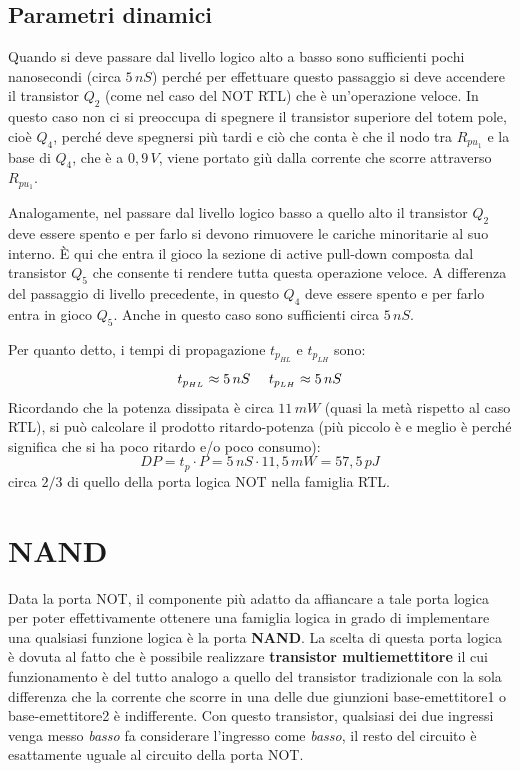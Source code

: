 \documentclass[12pt, a4paper]{report}
\begin{document}
\subsection{Parametri dinamici}
Quando si deve passare dal livello logico alto a basso sono sufficienti pochi nanosecondi (circa $5\,nS$) perché per effettuare questo passaggio si deve accendere il transistor $Q_2$ (come nel caso del NOT RTL) che è un'operazione veloce. In questo caso non ci si preoccupa di spegnere il transistor superiore del totem pole, cioè $Q_4$, perché deve spegnersi più tardi e ciò che conta è che il nodo tra $R_{pu_{1}}$ e la base di $Q_4$, che è a $0,9\,V$, viene portato giù dalla corrente che scorre attraverso $R_{pu_{1}}$.

Analogamente, nel passare dal livello logico basso a quello alto il transistor $Q_2$ deve essere spento e per farlo si devono rimuovere le cariche minoritarie al suo interno. È qui che entra il gioco la sezione di active pull-down composta dal transistor $Q_5$ che consente ti rendere tutta questa operazione veloce. A differenza del passaggio di livello precedente, in questo $Q_4$ deve essere spento e per farlo entra in gioco $Q_5$. Anche in questo caso sono sufficienti circa $5\,nS$. 

Per quanto detto, i tempi di propagazione $t_{p_{HL}}$ e $t_{p_{LH}}$ sono:
\begin{equation}
    t_{p_{HL}} \approx 5\,nS \text{ \, \, } t_{p_{LH}} \approx 5\,nS
\end{equation}
Ricordando che la potenza dissipata è circa $11\,mW$ (quasi la metà rispetto al caso RTL), si può calcolare il prodotto ritardo-potenza (più piccolo è e meglio è perché significa che si ha poco ritardo e/o poco consumo):
\begin{equation}
    \textit{DP} = t_{p} \cdot P = 5\,nS \cdot 11,5\,mW = 57,5\,pJ
\end{equation}
circa $2/3$ di quello della porta logica NOT nella famiglia RTL.
\section{NAND}
Data la porta NOT, il componente più adatto da affiancare a tale porta logica per poter effettivamente ottenere una famiglia logica in grado di implementare una qualsiasi funzione logica è la porta \textbf{NAND}. La scelta di questa porta logica è dovuta al fatto che è possibile realizzare \textbf{transistor multiemettitore} il cui funzionamento è del tutto analogo a quello del transistor tradizionale con la sola differenza che la corrente che scorre in una delle due giunzioni base-emettitore1 o base-emettitore2 è indifferente. Con questo transistor, qualsiasi dei due ingressi venga messo \textit{basso} fa considerare l'ingresso come \textit{basso}, il resto del circuito è esattamente uguale al circuito della porta NOT.
\end{document}
